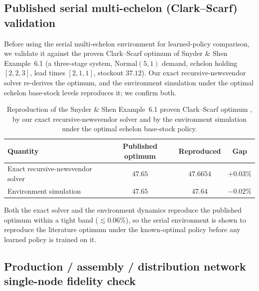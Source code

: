 \documentclass[11pt]{article}
\begin{document}
\subsection{Published serial multi-echelon (Clark--Scarf) validation}
\label{app:serial-validation}

Before using the serial multi-echelon environment for learned-policy comparison, we validate it
against the proven Clark--Scarf optimum of Snyder \& Shen Example~6.1
\citep{snyder2019foundations} (a three-stage system, $\mathrm{Normal}(5,1)$ demand, echelon holding
$[2,2,3]$, lead times $[2,1,1]$, stockout $37.12$). Our exact recursive-newsvendor solver
re-derives the optimum, and the environment
simulation under the optimal echelon base-stock levels reproduces it; we confirm both.

\begin{table}[!htbp]
\centering
\caption{Reproduction of the Snyder \& Shen Example~6.1 proven Clark--Scarf optimum
\citep{snyder2019foundations}, by our exact recursive-newsvendor solver and by the environment
simulation under the optimal echelon base-stock policy.}
\label{tab:serial-validation}
\begin{tabular}{lccc}
\toprule
Quantity & Published optimum & Reproduced & Gap \\
\midrule
Exact recursive-newsvendor solver & $47.65$ & $47.6654$ & $+0.03\%$ \\
Environment simulation & $47.65$ & $47.64$ & $-0.02\%$ \\
\bottomrule
\end{tabular}
\end{table}
\FloatBarrier

Both the exact solver and the environment dynamics reproduce the published optimum within a tight
band ($\lesssim 0.06\%$), so the serial environment is shown to reproduce the literature optimum under
the known-optimal policy before any learned policy is trained on it.

\subsection{Production / assembly / distribution network single-node fidelity check}
\label{app:pirhoo-validation}
\end{document}
